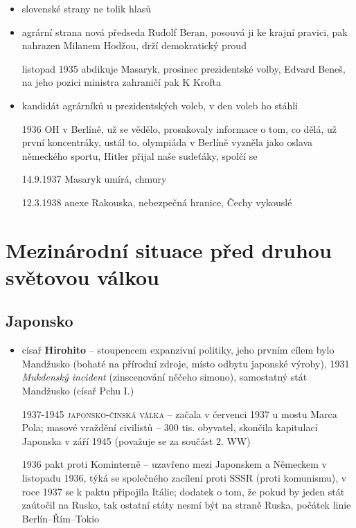 \documentclass{article}
\begin{document}
\begin{itemize}
    \item slovenské strany ne tolik hlasů
    \item agrární strana nová předseda Rudolf Beran, posouvá ji ke krajní pravici, pak nahrazen Milanem Hodžou, drží demokratický proud
    \item[listopad 1935] abdikuje Masaryk, prosinec prezidentské volby, Edvard Beneš, na jeho pozici ministra zahraničí pak K Krofta
    \item kandidát agrárníků u prezidentských voleb, v den voleb ho stáhli
    \item[1936] OH v Berlíně, už se vědělo, prosakovaly informace o tom, co dělá, už první koncentráky, ustál to, olympiáda v Berlíně vyzněla jako oslava německého sportu, Hitler přijal naše sudeťáky, spolčí se
    \item[14.9.1937] Masaryk umírá, chmury
    \item[12.3.1938] anexe Rakouska, nebezpečná hranice, Čechy vykouslé
\end{itemize}

\section*{Mezinárodní situace před druhou světovou válkou}
\subsection*{Japonsko}
\begin{itemize}
    \item císař \textbf{Hirohito} -- stoupencem expanzivní politiky, jeho prvním cílem bylo Mandžusko (bohaté na přírodní zdroje, místo odbytu japonské výroby), 1931 \textit{Mukdenský incident} (zinscenování něčeho simono), samostatný stát Mandžusko (císař Pchu I.)
    \item[1937-1945] \textsc{japonsko-čínská válka} -- začala v červenci 1937 u mostu Marca Pola; masové vraždění civilistů -- 300 tis. obyvatel, skončila kapitulací Japonska v září 1945 (považuje se za součást 2. WW)
    \item[1936] pakt proti Kominterně -- uzavřeno mezi Japonskem a Německem v listopadu 1936, týká se společného zacílení proti SSSR (proti komunismu), v roce 1937 se k paktu připojila Itálie;   dodatek o tom, že pokud by jeden stát zaútočil na Rusko, tak ostatní státy nesmí být na straně Ruska, počátek linie Berlín--Řím--Tokio
\end{itemize}
\end{document}
